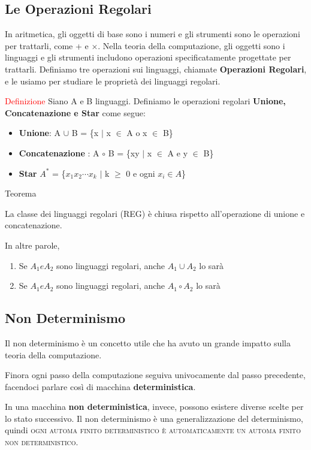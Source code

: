\documentclass{article}
\begin{document}
\subsection{Le Operazioni Regolari}
In aritmetica, gli oggetti di base sono i numeri e gli strumenti sono le
operazioni per trattarli, come + e $\times$. Nella teoria della computazione,
gli oggetti sono i linguaggi e gli strumenti includono operazioni
specificatamente progettate per trattarli. Definiamo tre operazioni sui
linguaggi, chiamate \textbf{Operazioni Regolari}, e le usiamo per studiare le
proprietà dei linguaggi regolari.

\textcolor{red}{Definizione}
Siano A e B linguaggi. Definiamo le operazioni regolari \textbf{Unione,
Concatenazione e Star} come segue:
\begin{itemize}
    \item \textbf{Unione}: A $\cup$ B = \{x $\mid$ x $\in$ A o x $\in$ B\}
    \item \textbf{Concatenazione} : A $\circ$ B = \{xy $\mid$ x $\in$ A e y
    $\in$ B\}
    \item \textbf{Star} $A^*$ = \{$x_1x_2 \cdots x_k$ $\mid$ k $\geq$ 0 e ogni
    $x_i \in A$\}
\end{itemize}

\textcolor{green! 50! black}{Teorema}

La classe dei linguaggi regolari (REG) è chiusa rispetto all'operazione di
unione e concatenazione.

In altre parole,
\begin{enumerate}
    \item Se $A_1 e A_2$ sono linguaggi regolari, anche $A_1 \cup A_2$ lo sarà
    \item Se $A_1 e A_2$ sono linguaggi regolari, anche $A_1 \circ A_2$ lo sarà
\end{enumerate}

\subsection{Non Determinismo}

Il non determinismo è un concetto utile che ha avuto un grande impatto sulla
teoria della computazione.

Finora ogni passo della computazione seguiva univocamente dal passo precedente,
facendoci parlare così di macchina \textbf{deterministica}.

In una macchina \textbf{non deterministica}, invece, possono esistere diverse
scelte per lo stato successivo. Il non determinismo è una generalizzazione del
determinismo, quindi \textsc{ogni automa finito deterministico è automaticamente
un automa finito non deterministico}.
\end{document}
